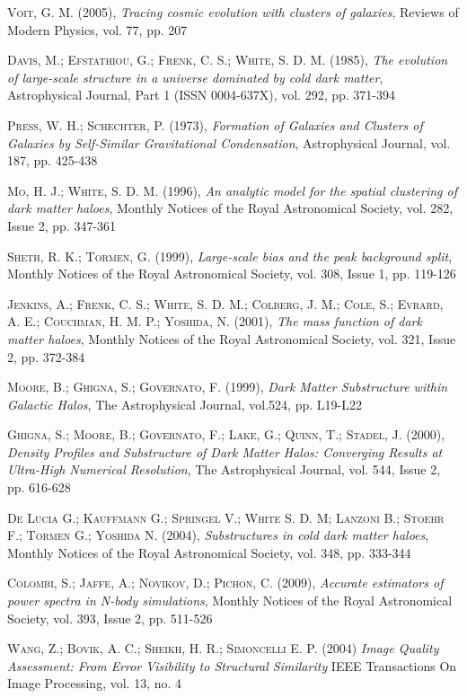 \documentclass[a4paper,openright,10pt, oneside, final]{book}
\begin{document}
\begin{thebibliography}{a}
 \textsc{Voit, G. M. (2005)},
\textit{Tracing cosmic evolution with clusters of galaxies},
Reviews of Modern Physics, vol. 77, pp. 207 


 \textsc{Davis, M.; Efstathiou, G.; Frenk, C. S.; White, S. D. M. (1985)},
\textit{The evolution of large-scale structure in a universe dominated by cold dark matter},
Astrophysical Journal, Part 1 (ISSN 0004-637X), vol. 292, pp. 371-394 

 \textsc{Press, W. H.; Schechter, P. (1973)},
\textit{Formation of Galaxies and Clusters of Galaxies by Self-Similar Gravitational Condensation},
Astrophysical Journal, vol. 187, pp. 425-438

 \textsc{Mo, H. J.; White, S. D. M. (1996)},
\textit{An analytic model for the spatial clustering of dark matter haloes},
Monthly Notices of the Royal Astronomical Society, vol. 282, Issue 2, pp. 347-361

 \textsc{Sheth, R. K.; Tormen, G. (1999)},
\textit{Large-scale bias and the peak background split},
Monthly Notices of the Royal Astronomical Society, vol. 308, Issue 1, pp. 119-126

\textsc{Jenkins, A.; Frenk, C. S.; White, S. D. M.; Colberg, J. M.; Cole, S.; Evrard, A. E.; Couchman, H. M. P.; Yoshida, N. (2001)},
\textit{The mass function of dark matter haloes},
Monthly Notices of the Royal Astronomical Society, vol. 321, Issue 2, pp. 372-384


 \textsc{Moore, B.; Ghigna, S.; Governato, F. (1999)},
\textit{Dark Matter Substructure within Galactic Halos},
The Astrophysical Journal, vol.524, pp. L19-L22

 \textsc{Ghigna, S.; Moore, B.; Governato, F.; Lake, G.; Quinn, T.; Stadel, J. (2000)},
\textit{Density Profiles and Substructure of Dark Matter Halos: Converging Results at Ultra-High Numerical Resolution},
The Astrophysical Journal, vol. 544, Issue 2, pp. 616-628

 \textsc{De Lucia G.; Kauffmann G.; Springel V.; White S. D. M; Lanzoni B.; Stoehr F.; Tormen G.; Yoshida N. (2004)},
\textit{Substructures in cold dark matter haloes},
Monthly Notices of the Royal Astronomical Society, vol. 348, pp. 333-344




 \textsc{Colombi, S.; Jaffe, A.; Novikov, D.; Pichon, C. (2009)},
\textit{Accurate estimators of power spectra in N-body simulations}, 
Monthly Notices of the Royal Astronomical Society, vol. 393, Issue 2, pp. 511-526

 \textsc{Wang, Z.; Bovik, A. C.; Sheikh, H. R.; Simoncelli E. P. (2004)}
\textit{Image Quality Assessment: From Error Visibility to Structural Similarity}
IEEE Transactions On Image Processing, vol. 13, no. 4
\end{thebibliography}
\end{document}
